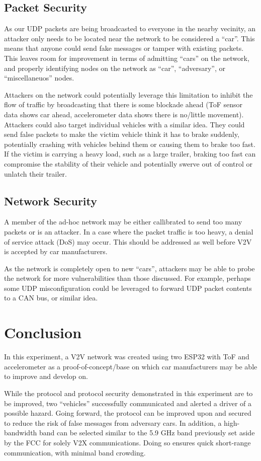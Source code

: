 \documentclass[conference]{IEEEtran}
\begin{document}
\subsection{Packet Security}
As our UDP packets are being broadcasted to everyone in the nearby vecinity, an
attacker only needs to be located near the network to be considered a ``car''.
This means that anyone could send fake messages or tamper with existing packets.
This leaves room for improvement in terms of admitting ``cars'' on the network,
and properly identifying nodes on the network as ``car'', ``adversary'', or
``miscellaneuos'' nodes.

Attackers on the network could potentially leverage this limitation to inhibit
the flow of traffic by broadcasting that there is some blockade ahead (ToF
sensor data shows car ahead, accelerometer data shows there is no/little
movement). Attackers could also target individual vehicles with a similar idea.
They could send false packets to make the victim vehicle think it has to brake
suddenly, potentially crashing with vehicles behind them or causing them to
brake too fast. If the victim is carrying a heavy load, such as a large trailer,
braking too fast can compromise the stability of their vehicle and potentially
swerve out of control or unlatch their trailer.

\subsection{Network Security}
A member of the ad-hoc network may be either callibrated to send too many
packets or is an attacker. In a case where the packet traffic is too heavy, a
denial of service attack (DoS) may occur. This should be addressed as well
before V2V is accepted by car manufacturers.

As the network is completely open to new ``cars'', attackers may be able to
probe the network for more vulnerabilities than those discussed. For example,
perhaps some UDP misconfiguration could be leveraged to forward UDP packet
contents to a CAN bus, or similar idea.

\section{Conclusion}
In this experiment, a V2V network was created using two ESP32 with ToF and
accelerometer as a proof-of-concept/base on which car manufacturers may be able
to improve and develop on.

While the protocol and protocol security demonstrated in this experiment are to
be improved, two ``vehicles'' successfully communicated and alerted a driver
of a possible hazard. Going forward, the protocol can be improved upon and 
secured to reduce the risk of false messages from adversary cars. In addition, 
a high-bandwidth band can be selected similar to the 5.9 GHz band previously
set aside by the FCC for solely V2X communications. Doing so ensures quick
short-range communication, with minimal band crowding.




\end{document}
